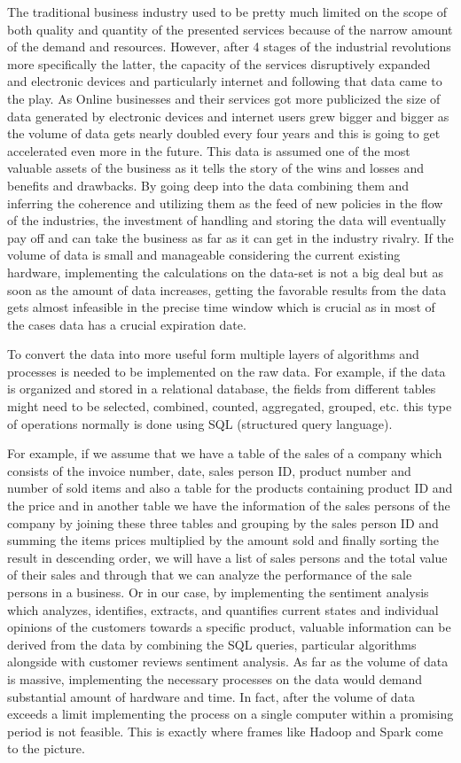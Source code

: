 \noindent
The traditional business industry used to be pretty much limited on the scope of both quality and quantity of the presented services because of the narrow amount of the demand and resources. However, after 4 stages of the industrial revolutions more specifically the latter, the capacity of the services disruptively expanded and electronic devices and particularly internet and following that data came to the play. As Online businesses and their services got more publicized the size of data generated by electronic devices and internet users grew bigger and bigger as the volume of data gets nearly doubled every four years \cite{statista} and this is going to get accelerated even more in the future. This data is assumed one of the most valuable assets of the business as it tells the story of the wins and losses and benefits and drawbacks. By going deep into the data combining them and inferring the coherence and utilizing them as the feed of new policies in the flow of the industries, the investment of handling and storing the data will eventually pay off and can take the business as far as it can get in the industry rivalry. If the volume of data is small and manageable considering the current existing hardware, implementing the calculations on the data-set is not a big deal but as soon as the amount of data increases, getting the favorable results from the data gets almost infeasible in the precise time window which is crucial as in most of the cases data has a crucial expiration date.

To convert the data into more useful form multiple layers of algorithms and processes is needed to be implemented on the raw data. For example, if the data is organized and stored in a relational database, the fields from different tables might need to be selected, combined, counted, aggregated, grouped, etc. this type of operations normally is done using SQL (structured query language). 

For example, if we assume that we have a table of the sales of a company which consists of the invoice number, date, sales person ID, product number and number of sold items and also a table for the products containing product ID and the price and in another table we have the information of the sales persons of the company by joining these three tables and grouping by the sales person ID and summing the items prices multiplied by the amount sold and finally sorting the result in descending order, we will have a list of sales persons and the total value of their sales and through that we can analyze the performance of the sale persons in a business. Or in our case, by implementing the sentiment analysis which analyzes, identifies, extracts, and quantifies current states and individual opinions \cite{sentiment_2022} of the customers towards a specific product, valuable information can be derived from the data by combining the SQL queries, particular algorithms alongside with customer reviews sentiment analysis. As far as the volume of data is massive, implementing the necessary processes on the data would demand substantial amount of hardware and time. In fact, after the volume of data exceeds a limit implementing the process on a single computer within a promising period is not feasible. This is exactly where frames like Hadoop and Spark come to the picture.